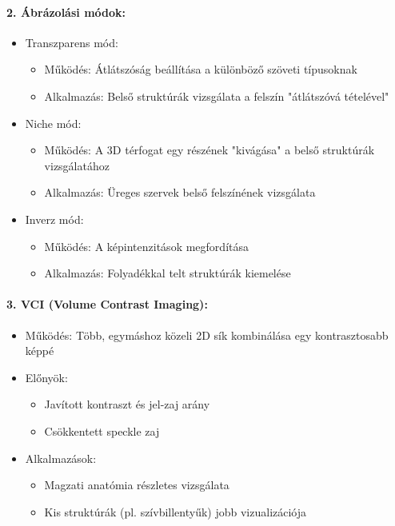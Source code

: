 \documentclass[a4paper,12pt]{article}
\begin{document}
\paragraph{2. Ábrázolási módok:} \begin{itemize} \item Transzparens mód: \begin{itemize} \item Működés: Átlátszóság beállítása a különböző szöveti típusoknak \item Alkalmazás: Belső struktúrák vizsgálata a felszín "átlátszóvá tételével" \end{itemize} \item Niche mód: \begin{itemize} \item Működés: A 3D térfogat egy részének "kivágása" a belső struktúrák vizsgálatához \item Alkalmazás: Üreges szervek belső felszínének vizsgálata \end{itemize} \item Inverz mód: \begin{itemize} \item Működés: A képintenzitások megfordítása \item Alkalmazás: Folyadékkal telt struktúrák kiemelése \end{itemize} \end{itemize}

\paragraph{3. VCI (Volume Contrast Imaging):} \begin{itemize} \item Működés: Több, egymáshoz közeli 2D sík kombinálása egy kontrasztosabb képpé \item Előnyök: \begin{itemize} \item Javított kontraszt és jel-zaj arány \item Csökkentett speckle zaj \end{itemize} \item Alkalmazások: \begin{itemize} \item Magzati anatómia részletes vizsgálata \item Kis struktúrák (pl. szívbillentyűk) jobb vizualizációja \end{itemize} \end{itemize}
\end{document}
